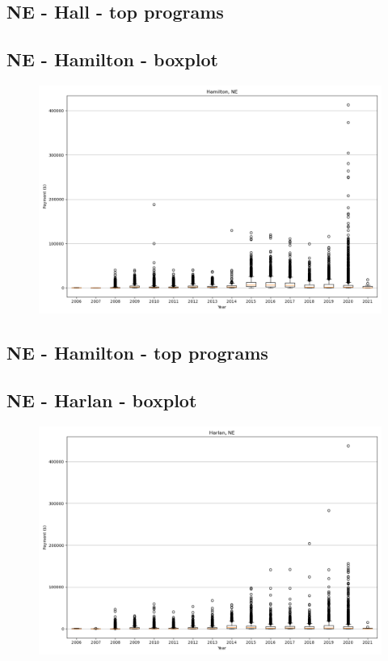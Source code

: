 \subsection*{NE - Hall - top programs}

\newpage
\subsection*{NE - Hamilton - boxplot}
\begin{figure}[h]
\centering
\includegraphics[width=7in]{../output/boxplots/counties/Hamilton-NE_boxplot.png}
\end{figure}


\subsection*{NE - Hamilton - top programs}

\newpage
\subsection*{NE - Harlan - boxplot}
\begin{figure}[h]
\centering
\includegraphics[width=7in]{../output/boxplots/counties/Harlan-NE_boxplot.png}
\end{figure}


